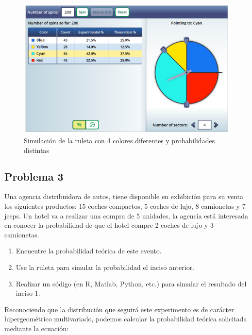 \documentclass{article}
\begin{document}
            \begin{figure}[!htbp]
                \centering
                \includegraphics[scale=0.3]{img/simulacion-ruleta-2.png}
                \caption{Simulación de la ruleta con 4 colores diferentes y probabilidades distintas}
                \label{fig:simulacion-ruleta-2}
            \end{figure}

        \subsection*{Problema 3}

            Una agencia distribuidora de autos, tiene disponible en exhibición para su venta los siguientes productos: 15 coches compactos, 5 coches de lujo, 8 camionetas y 7 jeeps. Un hotel va a realizar una compra de 5 unidades, la agencia está interesada en conocer la probabilidad de que el hotel compre 2 coches de lujo y 3 camionetas.

            \begin{enumerate}
                \item Encuentre la probabilidad teórica de este evento.
                \item Use la ruleta para simular la probabilidad el inciso anterior.
                \item Realizar un código (en R, Matlab, Python, etc.) para simular el resultado del inciso 1.
            \end{enumerate}
        
            Reconociendo que la distribución que seguirá este experimento es de carácter hipergeométrico multivariado, podemos calcular la probabilidad teórica solicitada mediante la ecuación:
\end{document}
